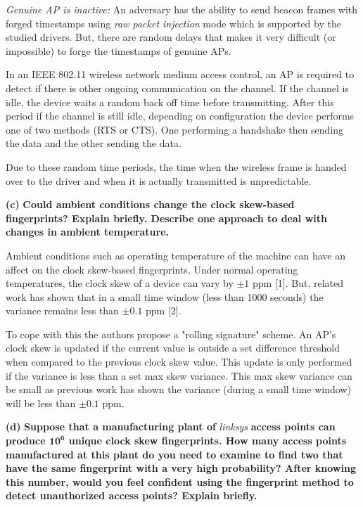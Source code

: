 \documentclass[11pt]{article}
\renewcommand\part[1]{\vspace{.10in}\textbf{(#1)}}
\begin{document}
\textit{Genuine AP is inactive:} An adversary has the ability to send beacon frames with forged timestamps using \textit{raw packet injection} mode which is supported by the studied drivers. But, there are random delays that makes it very difficult (or impossible) to forge the timestamps of genuine APs.

In an IEEE 802.11 wireless network medium access control, an AP is required to detect if there is other ongoing communication on the channel. If the channel is idle, the device waits a random back off time before transmitting. After this period if the channel is still idle, depending on configuration the device performs one of two methods (RTS or CTS). One performing a handshake then sending the data and the other sending the data.

Due to these random time periods, the time when the wireless frame is handed over to the driver and when it is actually transmitted is unpredictable.

\part{c} \textbf{Could ambient conditions change the clock skew-based fingerprints? Explain briefly. Describe one approach to deal with changes in ambient temperature.}

Ambient conditions such as operating temperature of the machine can have an affect on the clock skew-based fingerprints. Under normal operating temperatures, the clock skew of a device can vary by $\pm1$ ppm [1]. But, related work has shown that in a small time window (less than 1000 seconds) the variance remains less than $\pm0.1$ ppm [2].

To cope with this the authors propose a "rolling signature" scheme. An AP's clock skew is updated if the current value is outside a set difference threshold when compared to the previous clock skew value. This update is only performed if the variance is less than a set max skew variance. This max skew variance can be small as previous work has shown the variance (during a small time window) will be less than $\pm0.1$ ppm.

\part{d} \textbf{Suppose that a manufacturing plant of} \textit{linksys} \textbf{access points can produce $\mathbf{10^6}$ unique clock skew fingerprints. How many access points manufactured at this plant do you need to examine to find two that have the same fingerprint with a very high probability? After knowing this number, would you feel confident using the fingerprint method to detect unauthorized access points? Explain briefly.}
\end{document}
